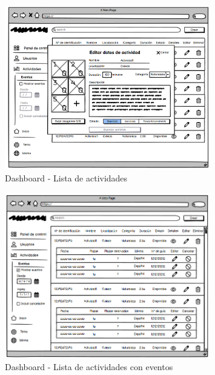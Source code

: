 \begin{figure}[H]
	\centering
	\includegraphics[width=0.8\textwidth]{5-AnalisisDelSistemaDeInformacion/InterfacesDeUsuario/Dashboard/lista de actividades edit.png}
	\caption{Dashboard - Lista de actividades}
\end{figure}

\begin{figure}[H]
	\centering
	\includegraphics[width=0.8\textwidth]{5-AnalisisDelSistemaDeInformacion/InterfacesDeUsuario/Dashboard/lista eventos.png}
	\caption{Dashboard - Lista de actividades con eventos}
\end{figure}

